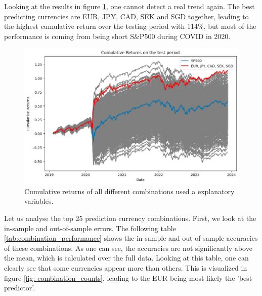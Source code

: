 \noindent Looking at the results in figure \ref{fig: cumulative returns best predictor}, one cannot detect a real trend again. The best predicting currencies are EUR, JPY, CAD, SEK and SGD together, leading to the highest cumulative return over the testing period with 114\%, but most of the performance is coming from being short S\&P500 during COVID in 2020. 

\begin{figure}[h!]
\begin{center}
  \includegraphics[width=\textwidth]{images/best_predictor.png}
  \end{center}
  \caption[Cumulative returns of all currency combinations]{Cumulative returns of all different combinations used a explanatory variables.}
  \label{fig: cumulative returns best predictor}
\end{figure}

\noindent Let us analyse the top 25 prediction currency combinations. First, we look at the in-sample and out-of-sample errors. The following table \ref{tab:combination_performance} shows the in-sample and out-of-sample accuracies of these combinations. As one can see, the accuracies are not significantly above the mean, which is calculated over the full data. Looking at this table, one can clearly see that some currencies appear more than others. This is visualized in figure \ref{fig: combination_counts}, leading to the EUR being most likely the 'best predictor'.


